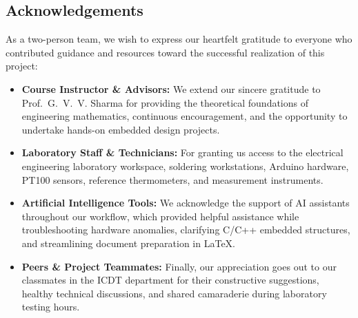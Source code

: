 \documentclass[journal,12pt,onecolumn]{IEEEtran}
\begin{document}
\subsection*{Acknowledgements}
As a two-person team, we wish to express our heartfelt gratitude to everyone who contributed guidance and resources toward the successful realization of this project:
\begin{itemize}
	\item \textbf{Course Instructor \& Advisors:} We extend our sincere gratitude to Prof.~G.~V.~V. Sharma for providing the theoretical foundations of engineering mathematics, continuous encouragement, and the opportunity to undertake hands-on embedded design projects.
	\item \textbf{Laboratory Staff \& Technicians:} For granting us access to the electrical engineering laboratory workspace, soldering workstations, Arduino hardware, PT100 sensors, reference thermometers, and measurement instruments.
	\item \textbf{Artificial Intelligence Tools:} We acknowledge the support of AI assistants throughout our workflow, which provided helpful assistance while troubleshooting hardware anomalies, clarifying C/C++ embedded structures, and streamlining document preparation in \LaTeX.
	\item \textbf{Peers \& Project Teammates:} Finally, our appreciation goes out to our classmates in the ICDT department for their constructive suggestions, healthy technical discussions, and shared camaraderie during laboratory testing hours.
\end{itemize}
\end{document}
